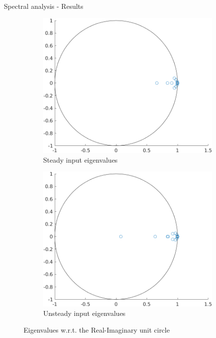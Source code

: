 \documentclass{beamer}
\begin{document}
\begin{frame}{Spectral analysis - Results}
    \begin{figure}
        \centering
        \begin{subfigure}[b]{0.45\textwidth}
            \centering
            \includegraphics[width=\textwidth]{Steady_Eigen.png}
            \caption{Steady input eigenvalues}
            \label{fig:steady_eigen}
        \end{subfigure}
        \hfill
        \begin{subfigure}[b]{0.45\textwidth}
            \centering
            \includegraphics[width=\textwidth]{Unsteady_Eigen.png}
            \caption{Unsteady input eigenvalues}
            \label{fig:unsteady_eigen}
        \end{subfigure}
        \caption{Eigenvalues w.r.t. the Real-Imaginary unit circle}
        \label{fig:eigen}
    \end{figure}
\end{frame}
\end{document}
